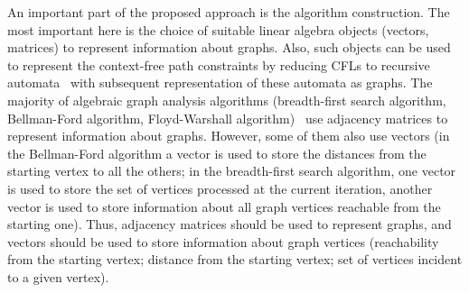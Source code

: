 An important part of the proposed approach is the algorithm construction. The most important here is the choice of suitable linear algebra objects (vectors, matrices) to represent information about graphs. Also, such objects can be used to represent the context-free path constraints by reducing CFLs to recursive automata~\cite{alur2005analysis} with subsequent representation of these automata as graphs. The majority of algebraic graph analysis algorithms (breadth-first search algorithm, Bellman-Ford algorithm, Floyd-Warshall algorithm)~\cite{kepner2011graph} use adjacency matrices to represent information about graphs. However, some of them also use vectors (in the Bellman-Ford algorithm a vector is used to store the distances from the starting vertex to all the others; in the breadth-first search algorithm, one vector is used to store the set of vertices processed at the current iteration, another vector is used to store information about all graph vertices reachable from the starting one). Thus, adjacency matrices should be used to represent graphs, and vectors should be used to store information about graph vertices (reachability from the starting vertex; distance from the starting vertex; set of vertices incident to a given vertex).


